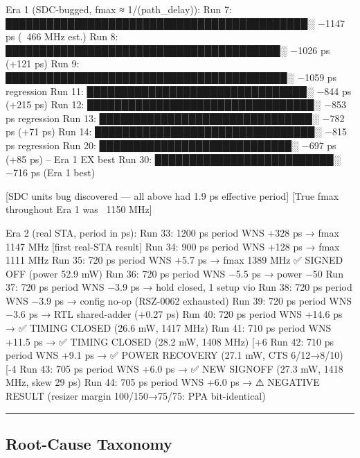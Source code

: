 \begin{record}

\begin{textblock}
Era 1 (SDC-bugged, fmax ≈ 1/(path_delay)):
Run  7:  ████████████████████████████████████████████░  −1147 ps  (~466 MHz est.)
Run  8:  ████████████████████████████████████████░     −1026 ps  (+121 ps)
Run  9:  █████████████████████████████████████████░    −1059 ps  regression
Run 11:  ████████████████████████████████░             −844 ps   (+215 ps)
Run 12:  █████████████████████████████████░            −853 ps   regression
Run 13:  ███████████████████████████████░              −782 ps   (+71 ps)
Run 14:  ████████████████████████████████░             −815 ps   regression
Run 20:  ████████████████████████████░                 −697 ps   (+85 ps) -- Era 1 EX best
Run 30:  ██████████████████████████░                   −716 ps   (Era 1 best)

  [SDC units bug discovered — all above had 1.9 ps effective period]
  [True fmax throughout Era 1 was ~1150 MHz]

Era 2 (real STA, period in ps):
Run 33:  1200 ps period  WNS +328 ps  → fmax 1147 MHz  [first real-STA result]
Run 34:   900 ps period  WNS +128 ps  → fmax 1111 MHz
Run 35:   720 ps period  WNS  +5.7 ps → fmax 1389 MHz  ✅ SIGNED OFF (power 52.9 mW)
Run 36:   720 ps period  WNS  −5.5 ps → power −50%
Run 37:   720 ps period  WNS  −3.9 ps → hold closed, 1 setup vio
Run 38:   720 ps period  WNS  −3.9 ps → config no-op (RSZ-0062 exhausted)
Run 39:   720 ps period  WNS  −3.6 ps → RTL shared-adder (+0.27 ps)
Run 40:   720 ps period  WNS +14.6 ps → ✅ TIMING CLOSED (26.6 mW, 1417 MHz)
Run 41:   710 ps period  WNS +11.5 ps → ✅ TIMING CLOSED (28.2 mW, 1408 MHz)  [+6%
Run 42:   710 ps period  WNS  +9.1 ps → ✅ POWER RECOVERY (27.1 mW, CTS 6/12→8/10)  [-4%
Run 43:   705 ps period  WNS  +6.0 ps → ✅ NEW SIGNOFF    (27.3 mW, 1418 MHz, skew 29 ps)
Run 44:   705 ps period  WNS  +6.0 ps → ⚠ NEGATIVE RESULT (resizer margin 100/150→75/75: PPA bit-identical)
\end{textblock}

\begin{center}\rule{0.5\linewidth}{0.5pt}\end{center}

\end{record}

\subsection{Root-Cause Taxonomy}\label{cr:run:asap7-cpu:root-cause-taxonomy}

